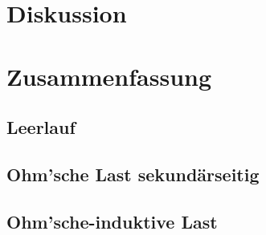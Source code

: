 \documentclass[12pt,a4paper,twoside]{article}
\begin{document}
\section{Diskussion} %




\section{Zusammenfassung} %

\subsection{Leerlauf}
\subsection{Ohm'sche Last sekundärseitig}
\subsection{Ohm'sche-induktive Last}



\printbibliography[heading=bibintoc]
\end{document}
